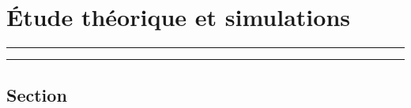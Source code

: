 \chapter{\'Etude théorique et simulations}
\vfill
\hrule \vspace{.5cm}
{\hypersetup{linkcolor = black}
\localtableofcontents
}%
\vspace{.5cm} \hrule
\vfill
\clearpage

\section{Section}